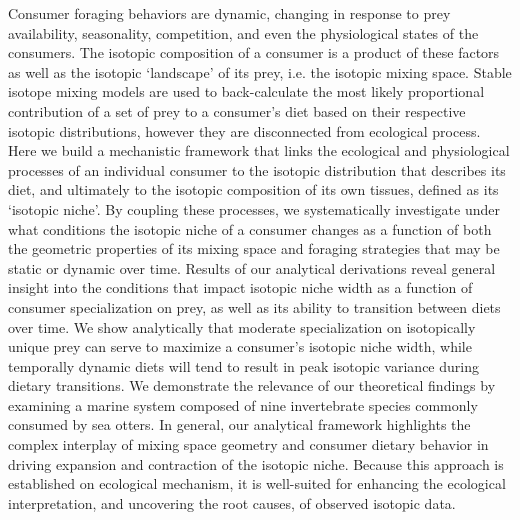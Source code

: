 \documentclass{article}
\begin{document}
Consumer foraging behaviors are dynamic, changing in response to prey availability, seasonality, competition, and even the physiological states of the consumers.
The isotopic composition of a consumer is a product of these factors as well as the isotopic `landscape' of its prey, i.e. the isotopic mixing space.
Stable isotope mixing models are used to back-calculate the most likely proportional contribution of a set of prey to a consumer's diet based on their respective isotopic distributions, however they are disconnected from ecological process.
Here we build a mechanistic framework that links the ecological and physiological processes of an individual consumer to the isotopic distribution that describes its diet, and ultimately to the isotopic composition of its own tissues, defined as its `isotopic niche'.
By coupling these processes, we systematically investigate under what conditions the isotopic niche of a consumer changes as a function of both the geometric properties of its mixing space and foraging strategies that may be static or dynamic over time.
Results of our analytical derivations reveal general insight into the conditions that impact isotopic niche width as a function of consumer specialization on prey, as well as its ability to transition between diets over time.
We show analytically that moderate specialization on isotopically unique prey can serve to maximize a consumer's isotopic niche width, while temporally dynamic diets will tend to result in peak isotopic variance during dietary transitions.
We demonstrate the relevance of our theoretical findings by examining a marine system composed of nine invertebrate species commonly consumed by sea otters.
In general, our analytical framework highlights the complex interplay of mixing space geometry and consumer dietary behavior in driving expansion and contraction of the isotopic niche.
Because this approach is established on ecological mechanism, it is well-suited for enhancing the ecological interpretation, and uncovering the root causes, of observed isotopic data.
\end{document}
